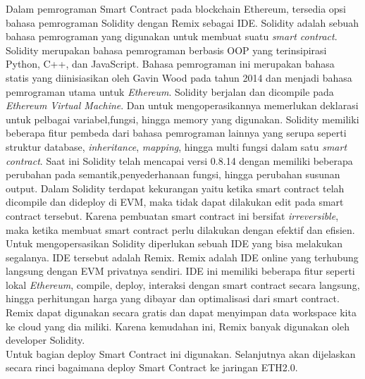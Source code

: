 Dalam pemrograman Smart Contract pada blockchain Ethereum, tersedia opsi bahasa pemrograman Solidity dengan Remix sebagai IDE. Solidity adalah sebuah bahasa pemrograman yang digunakan untuk membuat suatu \emph{smart contract}. Solidity merupakan bahasa pemrograman berbasis OOP yang terinsipirasi Python, C++, dan JavaScript. Bahasa pemrograman ini merupakan bahasa statis yang diinisiasikan oleh Gavin Wood pada tahun 2014 dan menjadi bahasa pemrograman utama untuk \emph{Ethereum}. Solidity berjalan dan dicompile pada \emph{Ethereum Virtual Machine}. Dan untuk mengoperasikannya memerlukan deklarasi untuk pelbagai variabel,fungsi, hingga memory yang digunakan. Solidity memiliki beberapa fitur pembeda dari bahasa pemrograman lainnya yang serupa seperti struktur database, \emph{inheritance}, \emph{mapping}, hingga multi fungsi dalam satu \emph{smart contract}. Saat ini Solidity telah mencapai versi 0.8.14 dengan memiliki beberapa perubahan pada semantik,penyederhanaan fungsi, hingga perubahan susunan output. Dalam Solidity terdapat kekurangan yaitu ketika smart contract telah dicompile dan dideploy di EVM, maka tidak dapat dilakukan edit pada smart contract tersebut. Karena pembuatan smart contract ini bersifat \emph{irreversible}, maka ketika membuat smart contract perlu dilakukan dengan efektif dan efisien. Untuk mengopersasikan Solidity diperlukan sebuah IDE yang bisa melakukan segalanya. IDE tersebut adalah Remix. Remix adalah IDE online yang terhubung langsung dengan EVM privatnya sendiri. IDE ini memiliki beberapa fitur seperti lokal \emph{Ethereum}, compile, deploy, interaksi dengan smart contract secara langsung, hingga perhitungan harga yang dibayar dan optimalisasi dari smart contract. Remix dapat digunakan secara gratis dan dapat menyimpan data workspace kita ke cloud yang dia miliki. Karena kemudahan ini, Remix banyak digunakan oleh developer Solidity. \\
Untuk bagian deploy Smart Contract ini digunakan.
Selanjutnya akan dijelaskan secara rinci bagaimana deploy Smart Contract ke jaringan ETH2.0.
